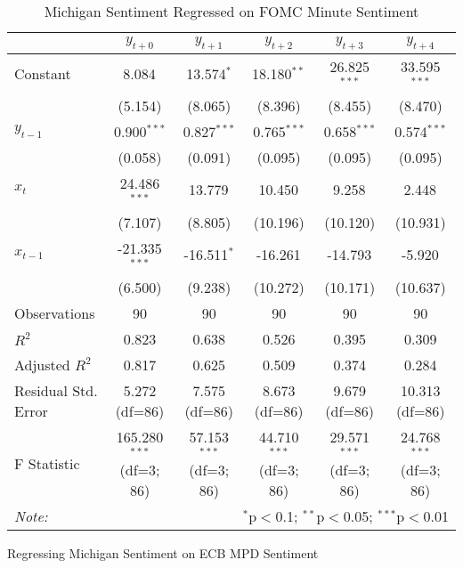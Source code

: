 \documentclass [12pt]{article}
\begin{document}
\begin{table}[H] \centering
  \caption{Michigan Sentiment Regressed on FOMC Minute Sentiment}
  \begin{adjustbox}{width=\textwidth}
\begin{tabular}{lccccc}
\hline
\hline
 & $y_{t+0}$ & $y_{t+1}$ & $y_{t+2}$ & $y_{t+3}$ & $y_{t+4}$  \\
\hline
 Constant & 8.084$^{}$ & 13.574$^{*}$ & 18.180$^{**}$ & 26.825$^{***}$ & 33.595$^{***}$ \\
& (5.154) & (8.065) & (8.396) & (8.455) & (8.470) \\
 $y_{t-1}$ & 0.900$^{***}$ & 0.827$^{***}$ & 0.765$^{***}$ & 0.658$^{***}$ & 0.574$^{***}$ \\
& (0.058) & (0.091) & (0.095) & (0.095) & (0.095) \\
 $x_{t}$ & 24.486$^{***}$ & 13.779$^{}$ & 10.450$^{}$ & 9.258$^{}$ & 2.448$^{}$ \\
& (7.107) & (8.805) & (10.196) & (10.120) & (10.931) \\
 $x_{t-1}$ & -21.335$^{***}$ & -16.511$^{*}$ & -16.261$^{}$ & -14.793$^{}$ & -5.920$^{}$ \\
& (6.500) & (9.238) & (10.272) & (10.171) & (10.637) \\
\hline
 Observations & 90 & 90 & 90 & 90 & 90 \\
 $R^2$ & 0.823 & 0.638 & 0.526 & 0.395 & 0.309 \\
 Adjusted $R^2$ & 0.817 & 0.625 & 0.509 & 0.374 & 0.284 \\
 Residual Std. Error & 5.272 (df=86) & 7.575 (df=86) & 8.673 (df=86) & 9.679 (df=86) & 10.313 (df=86) \\
 F Statistic & 165.280$^{***}$ (df=3; 86) & 57.153$^{***}$ (df=3; 86) & 44.710$^{***}$ (df=3; 86) & 29.571$^{***}$ (df=3; 86) & 24.768$^{***}$ (df=3; 86) \\
\hline
\hline
\textit{Note:} & \multicolumn{5}{r}{$^{*}$p$<$0.1; $^{**}$p$<$0.05; $^{***}$p$<$0.01} \\
\end{tabular}
\end{adjustbox}
\end{table}

Regressing Michigan Sentiment on ECB MPD Sentiment
\end{document}
